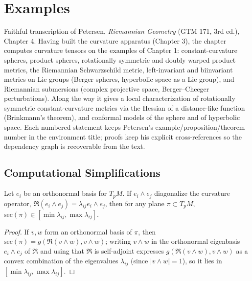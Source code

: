 \chapter{Examples}
\label{chap:pet-examples}

Faithful transcription of Petersen, \emph{Riemannian Geometry} (GTM 171, 3rd ed.),
Chapter 4. Having built the curvature apparatus (Chapter 3), the chapter computes
curvature tensors on the examples of Chapter 1: constant-curvature spheres, product
spheres, rotationally symmetric and doubly warped product metrics, the Riemannian
Schwarzschild metric, left-invariant and biinvariant metrics on Lie groups (Berger
spheres, hyperbolic space as a Lie group), and Riemannian submersions (complex
projective space, Berger--Cheeger perturbations). Along the way it gives a local
characterization of rotationally symmetric constant-curvature metrics via the Hessian
of a distance-like function (Brinkmann's theorem), and conformal models of the
sphere and of hyperbolic space. Each numbered statement keeps Petersen's
example/proposition/theorem number in the environment title; proofs keep his
explicit cross-references so the dependency graph is recoverable from the text.

\section{Computational Simplifications}

\begin{proposition}
  \label{prop:pet-ch4-curvature-operator-diagonal-bounds}
  \leanok
  Let $e_i$ be an orthonormal basis for $T_pM$. If $e_i\wedge e_j$ diagonalize the
  curvature operator, $\mathfrak{R}(e_i\wedge e_j)=\lambda_{ij}e_i\wedge e_j$, then for any
  plane $\pi\subset T_pM$, $\mathrm{sec}(\pi)\in[\min\lambda_{ij},\max\lambda_{ij}]$.
\end{proposition}
\begin{proof}
  \leanok
  If $v,w$ form an orthonormal basis of $\pi$, then
  $\mathrm{sec}(\pi)=g(\mathfrak{R}(v\wedge w),v\wedge w)$; writing $v\wedge w$ in the
  orthonormal eigenbasis $e_i\wedge e_j$ of $\mathfrak{R}$ and using that $\mathfrak{R}$ is
  self-adjoint expresses $g(\mathfrak{R}(v\wedge w),v\wedge w)$ as a convex combination of
  the eigenvalues $\lambda_{ij}$ (since $|v\wedge w|=1$), so it lies in
  $[\min\lambda_{ij},\max\lambda_{ij}]$.
\end{proof}

